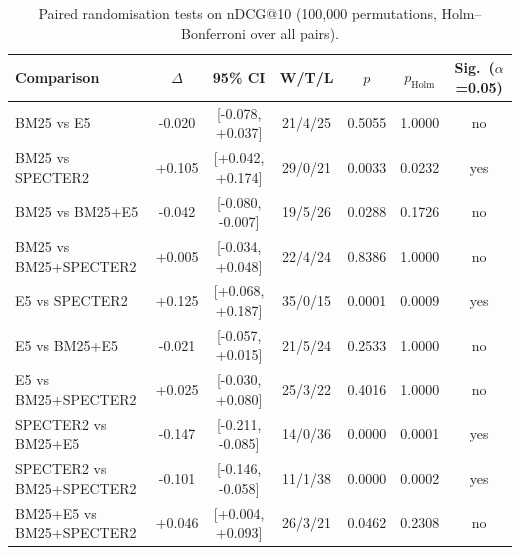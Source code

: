 \begin{table}[t]
\centering
\small
\caption{Paired randomisation tests on nDCG@10 (100,000 permutations, Holm--Bonferroni over all pairs).}
\label{tab:sig}
\begin{tabular}{lcccccc}
\toprule
Comparison & $\Delta$ & 95\% CI & W/T/L & $p$ & $p_{\text{Holm}}$ & Sig.\ ($\alpha$=0.05) \\
\midrule
BM25 vs E5 & -0.020 & [-0.078, +0.037] & 21/4/25 & 0.5055 & 1.0000 & no \\
BM25 vs SPECTER2 & +0.105 & [+0.042, +0.174] & 29/0/21 & 0.0033 & 0.0232 & yes \\
BM25 vs BM25+E5 & -0.042 & [-0.080, -0.007] & 19/5/26 & 0.0288 & 0.1726 & no \\
BM25 vs BM25+SPECTER2 & +0.005 & [-0.034, +0.048] & 22/4/24 & 0.8386 & 1.0000 & no \\
E5 vs SPECTER2 & +0.125 & [+0.068, +0.187] & 35/0/15 & 0.0001 & 0.0009 & yes \\
E5 vs BM25+E5 & -0.021 & [-0.057, +0.015] & 21/5/24 & 0.2533 & 1.0000 & no \\
E5 vs BM25+SPECTER2 & +0.025 & [-0.030, +0.080] & 25/3/22 & 0.4016 & 1.0000 & no \\
SPECTER2 vs BM25+E5 & -0.147 & [-0.211, -0.085] & 14/0/36 & 0.0000 & 0.0001 & yes \\
SPECTER2 vs BM25+SPECTER2 & -0.101 & [-0.146, -0.058] & 11/1/38 & 0.0000 & 0.0002 & yes \\
BM25+E5 vs BM25+SPECTER2 & +0.046 & [+0.004, +0.093] & 26/3/21 & 0.0462 & 0.2308 & no \\
\bottomrule
\end{tabular}
\end{table}
